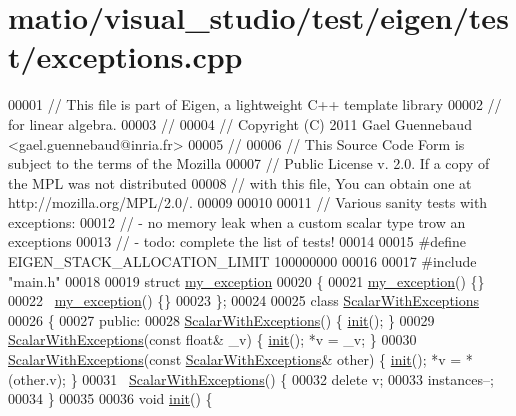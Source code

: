 \hypertarget{matio_2visual__studio_2test_2eigen_2test_2exceptions_8cpp_source}{}\section{matio/visual\+\_\+studio/test/eigen/test/exceptions.cpp}
\label{matio_2visual__studio_2test_2eigen_2test_2exceptions_8cpp_source}

\begin{DoxyCode}
00001 \textcolor{comment}{// This file is part of Eigen, a lightweight C++ template library}
00002 \textcolor{comment}{// for linear algebra.}
00003 \textcolor{comment}{//}
00004 \textcolor{comment}{// Copyright (C) 2011 Gael Guennebaud <gael.guennebaud@inria.fr>}
00005 \textcolor{comment}{//}
00006 \textcolor{comment}{// This Source Code Form is subject to the terms of the Mozilla}
00007 \textcolor{comment}{// Public License v. 2.0. If a copy of the MPL was not distributed}
00008 \textcolor{comment}{// with this file, You can obtain one at http://mozilla.org/MPL/2.0/.}
00009 
00010 
00011 \textcolor{comment}{// Various sanity tests with exceptions:}
00012 \textcolor{comment}{//  - no memory leak when a custom scalar type trow an exceptions}
00013 \textcolor{comment}{//  - todo: complete the list of tests!}
00014 
00015 \textcolor{preprocessor}{#define EIGEN\_STACK\_ALLOCATION\_LIMIT 100000000}
00016 
00017 \textcolor{preprocessor}{#include "main.h"}
00018 
00019 \textcolor{keyword}{struct }\hyperlink{structmy__exception}{my\_exception}
00020 \{
00021   \hyperlink{structmy__exception}{my\_exception}() \{\}
00022   ~\hyperlink{structmy__exception}{my\_exception}() \{\}
00023 \};
00024     
00025 \textcolor{keyword}{class }\hyperlink{class_scalar_with_exceptions}{ScalarWithExceptions}
00026 \{
00027   \textcolor{keyword}{public}:
00028     \hyperlink{class_scalar_with_exceptions}{ScalarWithExceptions}() \{ \hyperlink{structinit}{init}(); \}
00029     \hyperlink{class_scalar_with_exceptions}{ScalarWithExceptions}(\textcolor{keyword}{const} \textcolor{keywordtype}{float}& \_v) \{ \hyperlink{structinit}{init}(); *v = \_v; \}
00030     \hyperlink{class_scalar_with_exceptions}{ScalarWithExceptions}(\textcolor{keyword}{const} \hyperlink{class_scalar_with_exceptions}{ScalarWithExceptions}& other) \{ 
      \hyperlink{structinit}{init}(); *v = *(other.v); \}
00031     ~\hyperlink{class_scalar_with_exceptions}{ScalarWithExceptions}() \{
00032       \textcolor{keyword}{delete} v;
00033       instances--;
00034     \}
00035 
00036     \textcolor{keywordtype}{void} \hyperlink{structinit}{init}() \{

\end{DoxyCode}
